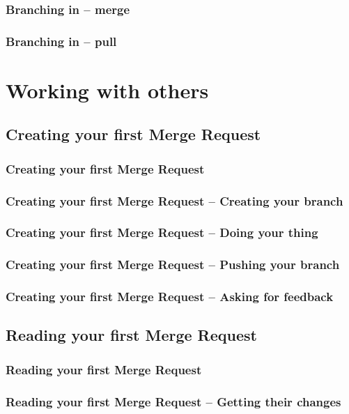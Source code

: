 \documentclass{beamer}
\begin{document}
\begin{frame}
  \frametitle{Branching in -- merge}
\end{frame}

\begin{frame}
  \frametitle{Branching in -- pull}
\end{frame}



\section{Working with others}
\subsection{Creating your first Merge Request}

\begin{frame}[fragile]
  \frametitle{Creating your first Merge Request}
\end{frame}

\begin{frame}[fragile]
  \frametitle{Creating your first Merge Request -- Creating your branch}
\end{frame}

\begin{frame}[fragile]
  \frametitle{Creating your first Merge Request -- Doing your thing}
\end{frame}

\begin{frame}[fragile]
  \frametitle{Creating your first Merge Request -- Pushing your branch}
\end{frame}

\begin{frame}[fragile]
  \frametitle{Creating your first Merge Request -- Asking for feedback}
\end{frame}

\subsection{Reading your first Merge Request}

\begin{frame}[fragile]
  \frametitle{Reading your first Merge Request}
\end{frame}

\begin{frame}[fragile]
  \frametitle{Reading your first Merge Request -- Getting their changes}
\end{frame}
\end{document}
